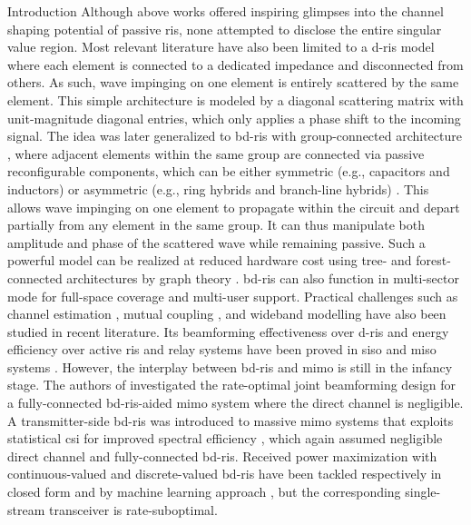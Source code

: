 \documentclass[journal]{IEEEtran}
\begin{document}
\begin{section}{Introduction}
		Although above works offered inspiring glimpses into the channel shaping potential of passive \gls{ris}, none attempted to disclose the entire singular value region.
		Most relevant literature \cite{ElMossallamy2021,Meng2023,Zheng2022,Huang2023,Bafghi2022,Zheng2023,Chae2023,Wu2019,Santamaria2023a} have also been limited to a \gls{d}-\gls{ris} model where each element is connected to a dedicated impedance and disconnected from others.
		As such, wave impinging on one element is entirely scattered by the same element.
		This simple architecture is modeled by a diagonal scattering matrix with unit-magnitude diagonal entries, which only applies a phase shift to the incoming signal.
		The idea was later generalized to \gls{bd}-\gls{ris} with group-connected architecture \cite{Shen2020a}, where adjacent elements within the same group are connected via passive reconfigurable components, which can be either symmetric (e.g., capacitors and inductors) or asymmetric (e.g., ring hybrids and branch-line hybrids) \cite{Ahn2006}.
		This allows wave impinging on one element to propagate within the circuit and depart partially from any element in the same group.
		It can thus manipulate both amplitude and phase of the scattered wave while remaining passive.
		Such a powerful model can be realized at reduced hardware cost using tree- and forest-connected architectures by graph theory \cite{Nerini2024}.
		\gls{bd}-\gls{ris} can also function in
		multi-sector mode \cite{Li2023c} for full-space coverage and multi-user support.
		Practical challenges such as channel estimation \cite{Li2024}, mutual coupling \cite{Li2023f}, and wideband modelling \cite{Li2024a} have also been studied in recent literature.
		Its beamforming effectiveness over \gls{d}-\gls{ris} and energy efficiency over active \gls{ris} and relay systems have been proved in \gls{siso} and \gls{miso} systems \cite{Shen2020a,Nerini2023,Nerini2024,Santamaria2023,Fang2023,Zhou2023,Li2023c,Soleymani2024}.
		However, the interplay between \gls{bd}-\gls{ris} and \gls{mimo} is still in the infancy stage.
		The authors of \cite{Bartoli2023} investigated the rate-optimal joint beamforming design for a fully-connected \gls{bd}-\gls{ris}-aided \gls{mimo} system where the direct channel is negligible.
		A transmitter-side \gls{bd}-\gls{ris} was introduced to
		massive \gls{mimo} systems that exploits statistical \gls{csi} for improved spectral efficiency \cite{Mishra2024}, which again assumed negligible direct channel and fully-connected \gls{bd}-\gls{ris}.
		Received power maximization with continuous-valued and discrete-valued \gls{bd}-\gls{ris} have been tackled respectively in closed form \cite{Nerini2023} and by machine learning approach \cite{Nerini2023b}, but the corresponding single-stream transceiver is rate-suboptimal.


\end{section}
\end{document}
